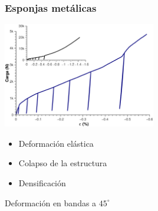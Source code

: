 \documentclass[usenames,dvipsnames]{beamer}
\begin{document}
\begin{frame}
\frametitle{Esponjas metálicas}

\begin{multicols}{2}

\includegraphics[width=0.5\textwidth]{img/intro/Cucompararesponja.eps}

\begin{itemize}
 \item \alert<1>{Deformación elástica}
 \item \alert<2>{Colapso de la estructura}
 \item \alert<3>{Densificación}
\end{itemize}

\end{multicols}

Deformación en bandas a $45 ^\circ$


\end{frame}

\end{document}
